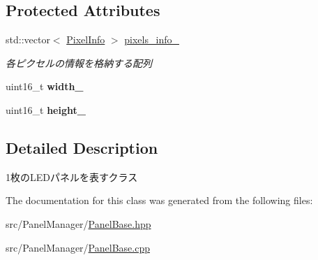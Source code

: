 \subsection*{Protected Attributes}
\begin{DoxyCompactItemize}
\item 
\mbox{\label{classPanelBase_a2bd215863e490bf3d5e53f97ae1268fd}} 
std\+::vector$<$ \hyperlink{structPixelInfo}{Pixel\+Info} $>$ \hyperlink{classPanelBase_a2bd215863e490bf3d5e53f97ae1268fd}{pixels\+\_\+info\+\_\+}
\begin{DoxyCompactList}\small\item\em 各ピクセルの情報を格納する配列 \end{DoxyCompactList}\item 
\mbox{\label{classPanelBase_a46af10a6ac5867c26b5ae13406f7c710}} 
uint16\+\_\+t {\bfseries width\+\_\+}
\item 
\mbox{\label{classPanelBase_a11f4802767a6e7954ff6e288cf94d21d}} 
uint16\+\_\+t {\bfseries height\+\_\+}
\end{DoxyCompactItemize}


\subsection{Detailed Description}
1枚の\+L\+E\+Dパネルを表すクラス 

The documentation for this class was generated from the following files\+:\begin{DoxyCompactItemize}
\item 
src/\+Panel\+Manager/\hyperlink{PanelBase_8hpp}{Panel\+Base.\+hpp}\item 
src/\+Panel\+Manager/\hyperlink{PanelBase_8cpp}{Panel\+Base.\+cpp}\end{DoxyCompactItemize}
